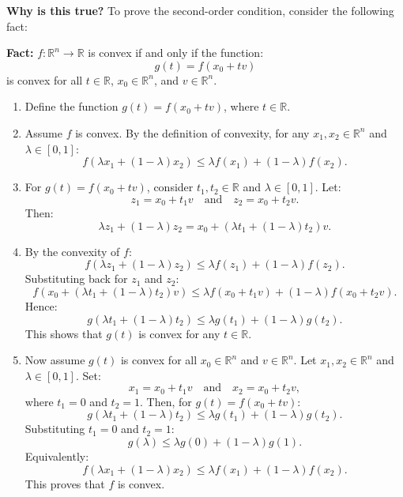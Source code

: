 \begin{derivation}
    \textbf{Why is this true?}
    To prove the second-order condition, consider the following fact:

    \textbf{Fact:} \( f: \mathbb{R}^n \to \mathbb{R} \) is convex if and only if the function:
    \[
    g(t) = f(x_0 + tv)
    \]
    is convex for all \( t \in \mathbb{R} \), \( x_0 \in \mathbb{R}^n \), and \( v \in \mathbb{R}^n \).
    \begin{enumerate}
        \item Define the function \( g(t) = f(x_0 + tv) \), where \( t \in \mathbb{R} \).
        \item Assume \( f \) is convex. By the definition of convexity, for any \( x_1, x_2 \in \mathbb{R}^n \) and \( \lambda \in [0,1] \):
        \[
        f(\lambda x_1 + (1 - \lambda)x_2) \leq \lambda f(x_1) + (1 - \lambda)f(x_2).
        \]
        \item For \( g(t) = f(x_0 + tv) \), consider \( t_1, t_2 \in \mathbb{R} \) and \( \lambda \in [0,1] \). Let:
        \[
        z_1 = x_0 + t_1 v \quad \text{and} \quad z_2 = x_0 + t_2 v.
        \]
        Then:
        \[
        \lambda z_1 + (1 - \lambda)z_2 = x_0 + (\lambda t_1 + (1 - \lambda)t_2)v.
        \]
        \item By the convexity of \( f \):
        \[
        f(\lambda z_1 + (1 - \lambda)z_2) \leq \lambda f(z_1) + (1 - \lambda)f(z_2).
        \]
        Substituting back for \( z_1 \) and \( z_2 \):
        \[
        f(x_0 + (\lambda t_1 + (1 - \lambda)t_2)v) \leq \lambda f(x_0 + t_1 v) + (1 - \lambda)f(x_0 + t_2 v).
        \]
        Hence:
        \[
        g(\lambda t_1 + (1 - \lambda)t_2) \leq \lambda g(t_1) + (1 - \lambda)g(t_2).
        \]
        This shows that \( g(t) \) is convex for any \( t \in \mathbb{R} \).
    
        \item Now assume \( g(t) \) is convex for all \( x_0 \in \mathbb{R}^n \) and \( v \in \mathbb{R}^n \). Let \( x_1, x_2 \in \mathbb{R}^n \) and \( \lambda \in [0,1] \). Set:
        \[
        x_1 = x_0 + t_1 v \quad \text{and} \quad x_2 = x_0 + t_2 v,
        \]
        where \( t_1 = 0 \) and \( t_2 = 1 \). Then, for \( g(t) = f(x_0 + t v) \):
        \[
        g(\lambda t_1 + (1 - \lambda)t_2) \leq \lambda g(t_1) + (1 - \lambda)g(t_2).
        \]
        Substituting \( t_1 = 0 \) and \( t_2 = 1 \):
        \[
        g(\lambda) \leq \lambda g(0) + (1 - \lambda)g(1).
        \]
        Equivalently:
        \[
        f(\lambda x_1 + (1 - \lambda)x_2) \leq \lambda f(x_1) + (1 - \lambda)f(x_2).
        \]
        This proves that \( f \) is convex.
    

\end{enumerate}
\end{derivation}
